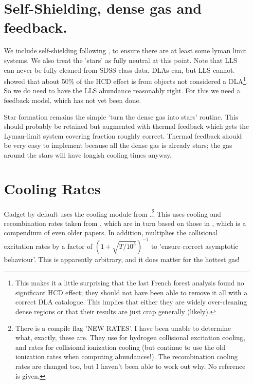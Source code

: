 \documentclass[10pt, aps, prd]{revtex4-1}
\begin{document}
\section{Self-Shielding, dense gas and feedback.}

We include self-shielding following \cite{Rahmati:2013}, to ensure there are at least some lyman limit systems. 
We also treat the 'stars' as fully neutral at this point. Note that LLS can never be fully cleaned from SDSS 
class data. DLAs can, but LLS cannot. \cite{McDonald:2005} showed that about 50\% of the HCD effect is from objects
not considered a DLA\footnote{This makes it a little surprising that the last French forest analysis found no 
significant HCD effect; they should not have been able to remove it all with a correct DLA catalogue. This implies
that either they are widely over-cleaning dense regions or that their results are just crap generally (likely).}. 
So we do need to have the LLS abundance reasonably right. For this we need a feedback model, which has not yet been done.

Star formation remains the simple 'turn the dense gas into stars' routine. This should probably be retained 
but augmented with thermal feedback which gets the Lyman-limit system covering fraction roughly correct. Thermal feedback should be very
easy to implement because all the dense gas is already stars; the gas around the stars will have longish cooling times anyway.

\section{Cooling Rates}

Gadget by default uses the cooling module from \cite{Katz:1996}.\footnote{There is a compile flag 'NEW RATES'. I have been unable to determine what,
exactly, these are. They use \cite{Scholz:1991} for hydrogen collisional excitation cooling, and \cite{Voronov:1997} rates for collisional 
ionization cooling (but continue to use the old ionization rates when computing abundances!). The recombination cooling rates are changed too, but I
haven't been able to work out why. No reference is given.} This uses cooling and recombination rates taken from \cite{Cen:1992}, which are in turn based
on those in \cite{Black:1981}, which is a compendium of even older papers. In addition, \cite{Cen:1992} multiplies the collisional excitation rates by
a factor of $(1+\sqrt{T/10^5})^{-1}$ to 'ensure correct asymptotic behaviour'. This is apparently arbitrary, and it does matter for the hottest gas!
\end{document}
